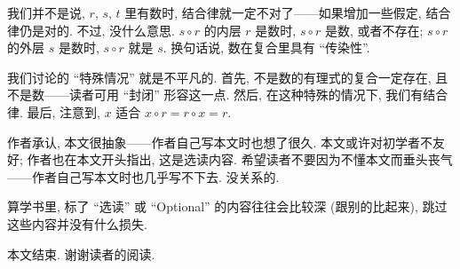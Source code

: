 我们并不是说, $r$, $s$, $t$ 里有数时, 结合律就一定不对了——如果增加一些假定, 结合律仍是对的. 不过, 没什么意思. $s \circ r$ 的内层 $r$ 是数时, $s \circ r$ 是数, 或者不存在; $s \circ r$ 的外层 $s$ 是数时, $s \circ r$ 就是 $s$. 换句话说, 数在复合里具有 ``传染性''.

我们讨论的 ``特殊情况'' 就是不平凡的. 首先, 不是数的有理式的复合一定存在, 且不是数——读者可用 ``封闭'' 形容这一点. 然后, 在这种特殊的情况下, 我们有结合律. 最后, 注意到, $x$ 适合 $x \circ r = r \circ x = r$.

作者承认, 本文很抽象——作者自己写本文时也想了很久. 本文或许对初学者不友好; 作者也在本文开头指出, 这是选读内容. 希望读者不要因为不懂本文而垂头丧气——作者自己写本文时也几乎写不下去. 没关系的.

算学书里, 标了 ``选读'' 或 ``Optional'' 的内容往往会比较深 (跟别的比起来), 跳过这些内容并没有什么损失.

本文结束. 谢谢读者的阅读.
